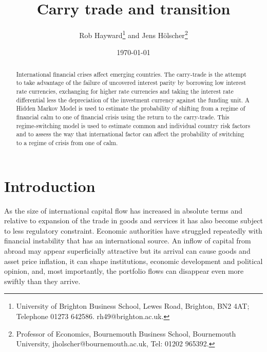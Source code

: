 \documentclass[12pt, a4paper, oneside]{article} %
\begin{document}
\title{Carry trade and transition}
\author{Rob Hayward\footnote{University of Brighton Business School, Lewes Road, Brighton, BN2 4AT; Telephone 01273 642586.  rh49@brighton.ac.uk.} and  Jens H\"{o}lscher\footnote{Professor of Economics, Bournemouth Business School, Bournemouth University, jholscher@bournemouth.ac.uk, Tel: 01202 965392.}} 
\date{\today}
\maketitle
\begin{abstract}
International financial crises affect emerging countries.  The carry-trade is the attempt to take advantage of the failure of uncovered interest parity by borrowing low interest rate currencies, exchanging for higher rate currencies and taking the interest rate differential less the depreciation of the investment currency against the funding unit.  A Hidden Markov Model is used to estimate the probability of shifting from a regime of financial calm to one of financial crisis using the return to the carry-trade.  This regime-switching model is used to estimate common and individual country risk factors and to assess the way that international factor can affect the probability of switching to a regime of crisis from one of calm.
\end{abstract}

\section{Introduction}
As the size of international capital flow has increased in absolute terms and relative to expansion of the trade in goods and services it has also become subject to less regulatory constraint. Economic authorities have struggled repeatedly with financial instability that has an international source.  An inflow of capital from abroad may appear superficially attractive but its arrival can cause goods and asset price inflation, it can shape institutions, economic development and political opinion, and, most importantly, the portfolio flows can disappear even more swiftly than they arrive.  %
\end{document}
